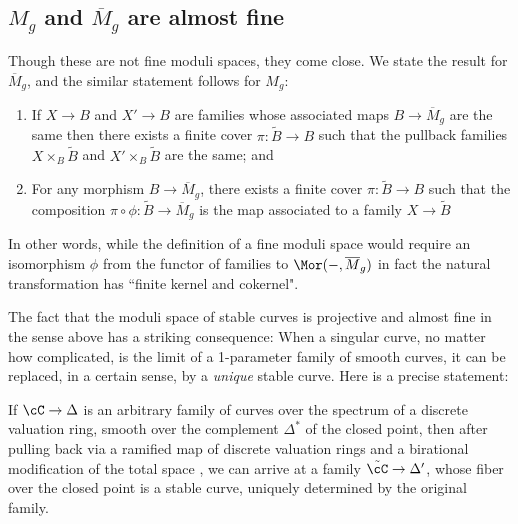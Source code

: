   

\subsection{$M_g$ and $\overline M_g$ are almost fine}\label{almost fine}

Though these are not fine moduli spaces, they come close. We state the result for $\overline M_g$, and the similar statement follows for $M_g$:

\begin{fact}
\begin{enumerate}
\item If $X \to B$ and $X' \to B$ are families whose associated maps $B \to \overline M_g$ are the same then there exists a finite cover $\pi : \tilde B \to B$ such that the pullback families $X \times_B \tilde B$ and $X' \times_B \tilde B$ are the same; and
\item For any morphism $B \to \overline M_g$, there exists a finite cover $\pi : \tilde B \to B$ such that the composition $\pi \circ \phi : \tilde B \to \overline M_g$ is the map associated to a family $X \to \tilde B$
\end{enumerate}
\end{fact}

In other words, while the definition of a fine moduli space would require an isomorphism $\phi$ from the functor of families
to $\Mor(-, \overline M_g)$ in fact the natural transformation has ``finite kernel and cokernel".

The fact that the moduli space of stable curves is projective and almost fine in the sense above has a striking consequence: When a singular curve, no matter how complicated, is the limit of a 1-parameter family of smooth curves, it can be replaced, in a certain sense, by a \emph{unique} stable curve. Here is a precise statement:

\begin{theorem}
If $\cC \to \Delta$ is an arbitrary family of curves over the spectrum of a discrete valuation ring, smooth over the complement $\Delta^*$ of the closed point, then after pulling back via a ramified map of
discrete valuation rings and a birational modification of the total space , we can arrive at a family $\tilde \cC \to \Delta'$, whose fiber over the closed point is a stable curve, uniquely determined by the original family.
\end{theorem}


